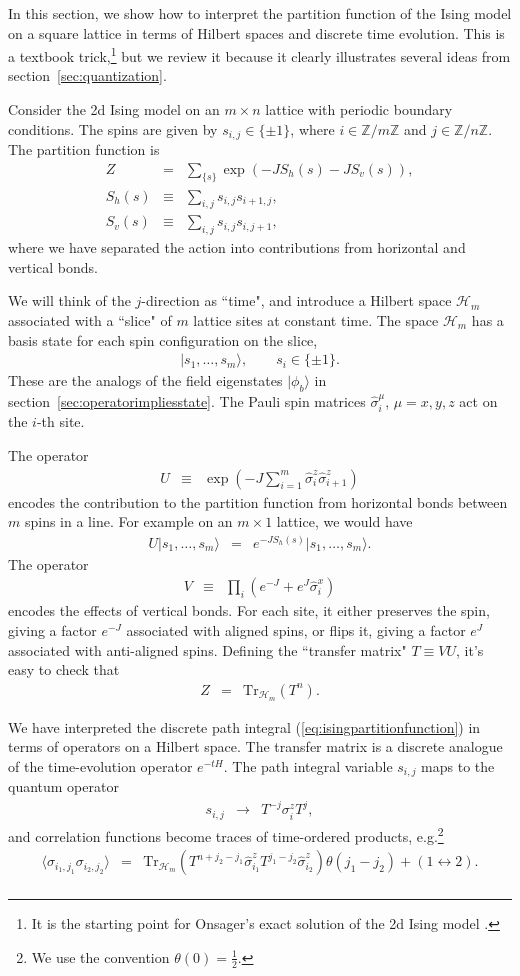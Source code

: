 \documentclass[11pt]{ws-rv9x6}
\newcommand\be{\begin{eqnarray}}
\newcommand\ee{\end{eqnarray}}
\newcommand\p[1]{\left(#1\right)}
\newcommand\<\langle
\renewcommand\>\rangle
\newcommand\Z{\mathbb{Z}}
\newcommand\nn{\nonumber}
\renewcommand\.{\cdot}
\newcommand\x\times
\newcommand\s\sigma
\newcommand\cH{\mathcal{H}}
\newcommand\Tr{\mathrm{Tr}}
\renewcommand\th{\theta}
\begin{document}
\begin{appendix}
\label{app:latticequantization}

In this section, we show how to interpret the partition function of the Ising model on a square lattice in terms of Hilbert spaces and discrete time evolution.  This is a textbook trick,\footnote{It is the starting point for Onsager's exact solution of the 2d Ising model \cite{PhysRev.65.117}.} but we review it because it clearly illustrates several ideas from section~\ref{sec:quantization}.

Consider the 2d Ising model on an $m\x n$ lattice with periodic boundary conditions.  The spins are given by $s_{i,j}\in \{\pm 1\}$, where $i\in \Z/m\Z$ and $j\in \Z/n\Z$.  The partition function is
\be
\label{eq:isingpartitionfunction}
Z &=& \sum_{\{s\}} \exp\p{-JS_h(s) -J S_v(s)},\nn\\
S_h(s) &\equiv& \sum_{i,j} s_{i,j}s_{i+1,j},\nn\\
S_v(s) &\equiv& \sum_{i,j} s_{i,j} s_{i,j+1},
\ee
where we have separated the action into contributions from horizontal and vertical bonds.

We will think of the $j$-direction as ``time", and introduce a Hilbert space $\cH_m$ associated with a ``slice" of $m$ lattice sites at constant time.  The space $\cH_m$ has a basis state for each spin configuration on the slice,
\be
|s_1,\dots,s_m\>,\qquad s_i\in\{\pm 1\}.
\ee
These are the analogs of the field eigenstates $|\phi_b\>$ in section~\ref{sec:operatorimpliesstate}.
The Pauli spin matrices $\widehat\sigma_i^{\mu}$, $\mu=x,y,z$ act on the $i$-th site.

The operator
\be
 U &\equiv & \exp\p{-J\sum_{i=1}^m \widehat\s^z_i \widehat\s^z_{i+1}}
\ee
encodes the contribution to the partition function from horizontal bonds between $m$ spins in a line. For example on an $m\x 1$ lattice, we would have
\be
 U |s_1,\dots,s_m\> &=& e^{-JS_h(s)}|s_1,\dots,s_m\>.
\ee
The operator
\be
 V &\equiv& \prod_i(e^{-J} + e^{J}\widehat\s_i^x)
\ee
encodes the effects of vertical bonds. For each site, it either preserves the spin, giving a factor $e^{-J}$ associated with aligned spins, or flips it, giving a factor $e^{J}$ associated with anti-aligned spins.  Defining the ``transfer matrix" $ T\equiv VU$, it's easy to check that
\be
Z &=& \Tr_{\cH_m}( T^n).
\ee

We have interpreted the discrete path integral (\ref{eq:isingpartitionfunction}) in terms of operators on a Hilbert space.  The transfer matrix is a discrete analogue of the time-evolution operator $e^{-tH}$.  The path integral variable $s_{i,j}$ maps to the quantum operator
\be 
\label{eq:quantizationmapone}
s_{i,j} &\to& T^{-j} \s_i^z  T^j,
\ee
and correlation functions become traces of time-ordered products, e.g.\footnote{We use the convention $\th(0)=\frac 1 2$.}
\be
\<\s_{i_1,j_1}\s_{i_2,j_2}\> &=& \Tr_{\cH_m}(T^{n+j_2-j_1} \widehat \s_{i_1}^z T^{j_1-j_2} \widehat \s_{i_2}^z)\theta(j_1 - j_2) + (1\leftrightarrow 2).\nn\\
\ee


\end{appendix}
\end{document}
